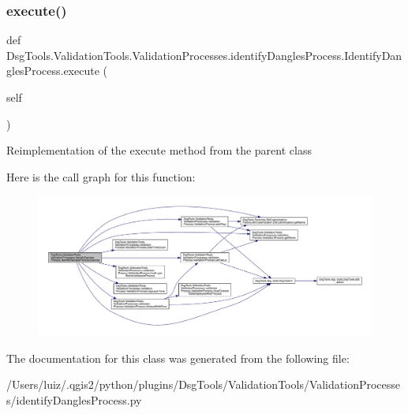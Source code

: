 \subsubsection{\texorpdfstring{execute()}{execute()}}
{\footnotesize\ttfamily def Dsg\+Tools.\+Validation\+Tools.\+Validation\+Processes.\+identify\+Dangles\+Process.\+Identify\+Dangles\+Process.\+execute (\begin{DoxyParamCaption}\item[{}]{self }\end{DoxyParamCaption})}

\begin{DoxyVerb}Reimplementation of the execute method from the parent class
\end{DoxyVerb}
 Here is the call graph for this function\+:
\nopagebreak
\begin{figure}[H]
\begin{center}
\leavevmode
\includegraphics[width=350pt]{class_dsg_tools_1_1_validation_tools_1_1_validation_processes_1_1identify_dangles_process_1_1_identify_dangles_process_ac0b9f0f92b710f37e903f826455f11dd_cgraph}
\end{center}
\end{figure}


The documentation for this class was generated from the following file\+:\begin{DoxyCompactItemize}
\item 
/\+Users/luiz/.\+qgis2/python/plugins/\+Dsg\+Tools/\+Validation\+Tools/\+Validation\+Processes/identify\+Dangles\+Process.\+py\end{DoxyCompactItemize}
